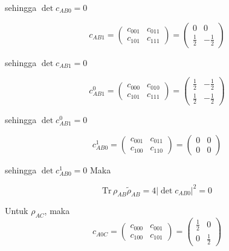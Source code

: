 sehingga $\det c_{AB0} = 0$

\begin{equation}
	c_{AB1}=
	\begin{pmatrix}
		c_{001} & c_{011} \\
		c_{101} & c_{111}
	\end{pmatrix}=
	\begin{pmatrix}
		0 & 0 \\
		\frac{1}{2} & -\frac{1}{2}
	\end{pmatrix}
\end{equation}

sehingga $\det c_{AB1} = 0$

\begin{equation}
	c_{AB1}^0=
	\begin{pmatrix}
		c_{000} & c_{010} \\
		c_{101} & c_{111}
	\end{pmatrix}=
	\begin{pmatrix}
		\frac{1}{2} & -\frac{1}{2} \\
		\frac{1}{2} & -\frac{1}{2}
	\end{pmatrix}
\end{equation}

sehingga $\det c_{AB1}^0 = 0$

\begin{equation}
	c_{AB0}^1=
	\begin{pmatrix}
		c_{001} & c_{011} \\
		c_{100} & c_{110}
	\end{pmatrix}=
	\begin{pmatrix}
		0 & 0 \\
		0 & 0
	\end{pmatrix}
\end{equation}

sehingga $\det c_{AB0}^1 = 0$
Maka

\begin{equation}
	\mathrm{Tr}\,\rho_{AB}\tilde{\rho}_{AB}=4|\det c_{AB0}|^2=0
\end{equation}

Untuk $\rho_{AC}$, maka
\begin{equation}
	c_{A0C}=
	\begin{pmatrix}
		c_{000} & c_{001} \\
		c_{100} & c_{101}
	\end{pmatrix}=
	\begin{pmatrix}
		\frac{1}{2} & 0 \\
		0 & \frac{1}{2}
	\end{pmatrix}
\end{equation}

